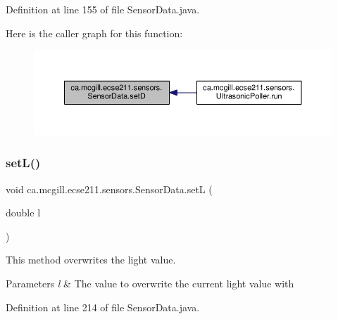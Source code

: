 Definition at line 155 of file Sensor\+Data.\+java.

Here is the caller graph for this function\+:
\nopagebreak
\begin{figure}[H]
\begin{center}
\leavevmode
\includegraphics[width=350pt]{classca_1_1mcgill_1_1ecse211_1_1sensors_1_1_sensor_data_ae20bf127c57dcfcb3b7632ca05b6d482_icgraph}
\end{center}
\end{figure}
\mbox{\label{classca_1_1mcgill_1_1ecse211_1_1sensors_1_1_sensor_data_aeafd49ce71819e8e1a5d5ff6287e7819}} 
\subsubsection{\texorpdfstring{set\+L()}{setL()}}
{\footnotesize\ttfamily void ca.\+mcgill.\+ecse211.\+sensors.\+Sensor\+Data.\+setL (\begin{DoxyParamCaption}\item[{double}]{l }\end{DoxyParamCaption})}

This method overwrites the light value.


\begin{DoxyParams}{Parameters}
{\em l} & The value to overwrite the current light value with \\
\hline
\end{DoxyParams}


Definition at line 214 of file Sensor\+Data.\+java.

